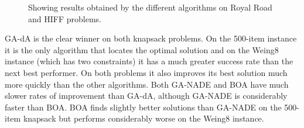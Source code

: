 \documentclass[twoside]{article}
\begin{document}
\begin{figure}[t!]
\centering
{}
\caption[Optional caption for list of figures]{Showing results obtained by the different algorithms on Royal Road and HIFF problems.}
\label{figure:results_plots2}
\end{figure}
GA-dA is the clear winner on both knapsack problems. On the 500-item instance it is the only algorithm that locates the optimal solution and on the Weing8 instance (which has two constraints) it has a much greater success rate than the next best performer. On both problems it also improves its best solution much more quickly than the other algorithms. Both GA-NADE and BOA have much slower rates of improvement than GA-dA, although GA-NADE is considerably faster than BOA. BOA finds slightly better solutions than GA-NADE on the 500-item knapsack but performs considerably worse on the Weing8 instance.
\end{document}
